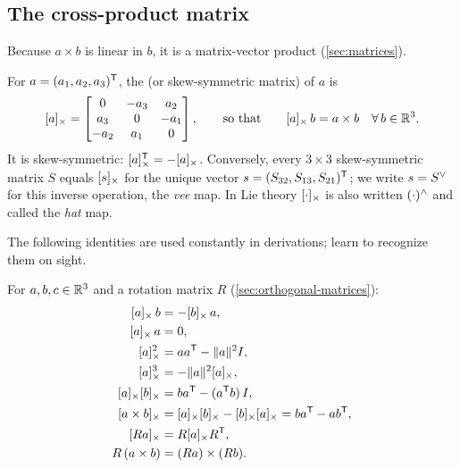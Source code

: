 \subsection{The cross-product matrix}

Because $a \times b$ is linear in $b$, it is a matrix-vector product (\cref{sec:matrices}).

\begin{definition}
For $a = (a_1, a_2, a_3)^{\mathsf{T}}$, the  (or skew-symmetric matrix) of $a$ is
\begin{equation}
  [a]_{\times} = \begin{bmatrix} 0 & -a_3 & a_2 \\ a_3 & 0 & -a_1 \\ -a_2 & a_1 & 0 \end{bmatrix},
  \qquad\text{so that}\qquad [a]_{\times}\, b = a \times b \quad \forall\, b \in \mathbb{R}^3 .
  \label{eq:skew}
\end{equation}
It is skew-symmetric: $[a]_{\times}^{\mathsf{T}} = -[a]_{\times}$. Conversely, every $3\times3$ skew-symmetric matrix $S$ equals $[s]_{\times}$ for
the unique vector $s = (S_{32}, S_{13}, S_{21})^{\mathsf{T}}$; we write $s = S^{\vee}$ for this inverse operation, the
\emph{vee} map. In Lie theory $[\cdot]_{\times}$ is also written $(\cdot)^{\wedge}$ and called the \emph{hat} map.
\end{definition}

The following identities are used constantly in derivations; learn to recognize them on sight.

\begin{proposition}
\label{prop:skew-identities}
For $a, b, c \in \mathbb{R}^3$ and a rotation matrix $R$ (\cref{sec:orthogonal-matrices}):
\begin{align}
  \sx{a}\, b &= -\sx{b}\, a, \label{eq:skew-anticomm}\\
  \sx{a}\, a &= 0, \label{eq:skew-self}\\
  \sx{a}^2 &= a a\T - \|a\|^2 I, \label{eq:skew-sq}\\
  \sx{a}^3 &= -\|a\|^2 \sx{a}, \label{eq:skew-cube}\\
  \sx{a}\sx{b} &= b a\T - (a\T b)\, I, \label{eq:skew-prod}\\
  \sx{a \times b} &= \sx{a}\sx{b} - \sx{b}\sx{a} = b a\T - a b\T, \label{eq:skew-commutator}\\
  \sx{R a} &= R \sx{a} R\T, \label{eq:skew-rot}\\
  R\,(a \times b) &= (Ra) \times (Rb). \label{eq:cross-rot}
\end{align}
\end{proposition}

